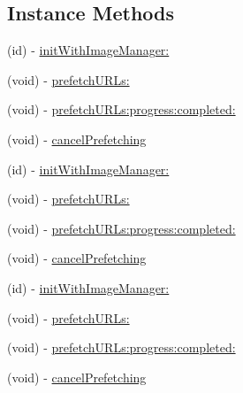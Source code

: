 \subsection*{Instance Methods}
\begin{DoxyCompactItemize}
\item 
(id) -\/ \mbox{\hyperlink{interface_s_d_web_image_prefetcher_a50a6d9b8ba5cecc7d070875bd858dfae}{init\+With\+Image\+Manager\+:}}
\item 
(void) -\/ \mbox{\hyperlink{interface_s_d_web_image_prefetcher_aca785918119f2b0d08ee1ff8b5310365}{prefetch\+U\+R\+Ls\+:}}
\item 
(void) -\/ \mbox{\hyperlink{interface_s_d_web_image_prefetcher_a6a7cfba8e166dd1e2039960dfcb98800}{prefetch\+U\+R\+Ls\+:progress\+:completed\+:}}
\item 
(void) -\/ \mbox{\hyperlink{interface_s_d_web_image_prefetcher_ac05c31b5d8d38b478753d62374fc860c}{cancel\+Prefetching}}
\item 
(id) -\/ \mbox{\hyperlink{interface_s_d_web_image_prefetcher_a50a6d9b8ba5cecc7d070875bd858dfae}{init\+With\+Image\+Manager\+:}}
\item 
(void) -\/ \mbox{\hyperlink{interface_s_d_web_image_prefetcher_aca785918119f2b0d08ee1ff8b5310365}{prefetch\+U\+R\+Ls\+:}}
\item 
(void) -\/ \mbox{\hyperlink{interface_s_d_web_image_prefetcher_a6a7cfba8e166dd1e2039960dfcb98800}{prefetch\+U\+R\+Ls\+:progress\+:completed\+:}}
\item 
(void) -\/ \mbox{\hyperlink{interface_s_d_web_image_prefetcher_ac05c31b5d8d38b478753d62374fc860c}{cancel\+Prefetching}}
\item 
(id) -\/ \mbox{\hyperlink{interface_s_d_web_image_prefetcher_a50a6d9b8ba5cecc7d070875bd858dfae}{init\+With\+Image\+Manager\+:}}
\item 
(void) -\/ \mbox{\hyperlink{interface_s_d_web_image_prefetcher_aca785918119f2b0d08ee1ff8b5310365}{prefetch\+U\+R\+Ls\+:}}
\item 
(void) -\/ \mbox{\hyperlink{interface_s_d_web_image_prefetcher_a6a7cfba8e166dd1e2039960dfcb98800}{prefetch\+U\+R\+Ls\+:progress\+:completed\+:}}
\item 
(void) -\/ \mbox{\hyperlink{interface_s_d_web_image_prefetcher_ac05c31b5d8d38b478753d62374fc860c}{cancel\+Prefetching}}
\end{DoxyCompactItemize}
